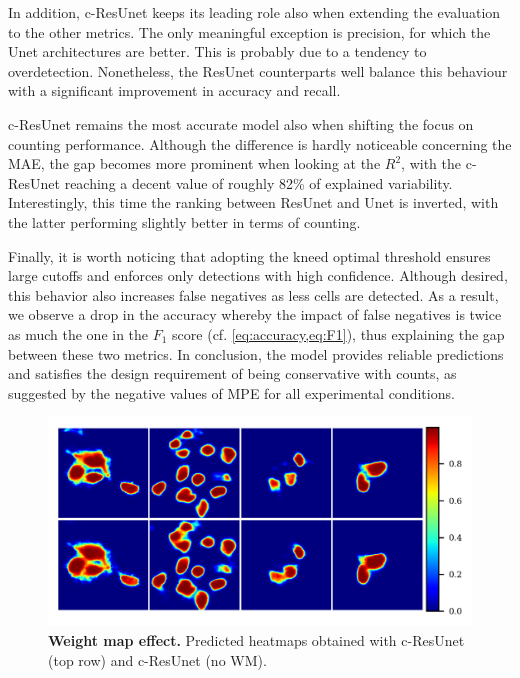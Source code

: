 In addition, c-ResUnet keeps its leading role also when extending the evaluation to the other metrics.
The only meaningful exception is precision, for which the Unet architectures are better. This is probably due to a tendency to overdetection. 
Nonetheless, the ResUnet counterparts well balance this behaviour with a significant improvement in accuracy and recall.

c-ResUnet remains the most accurate model also when shifting the focus on counting performance. Although the difference is hardly noticeable concerning the MAE, the gap becomes more prominent when looking at the $R^2$, with the \mbox{c-ResUnet} reaching a decent value of roughly 82\% of explained variability.
Interestingly, this time the ranking between ResUnet and Unet is inverted, with the latter performing slightly better in terms of counting.

Finally, it is worth noticing that adopting the kneed optimal threshold ensures large cutoffs and enforces only detections with high confidence.
Although desired, this behavior also increases false negatives as less cells are detected. 
As a result, we observe a drop in the accuracy whereby the impact of false negatives is twice as much the one in the $F_1$ score (cf. \cref{eq:accuracy,eq:F1}), thus explaining the gap between these two metrics.
In conclusion, the model provides reliable predictions and satisfies the design requirement of being conservative with counts, as suggested by the negative values of MPE for all experimental conditions.

\begin{figure}[!b]
\centering
\includegraphics[width=\textwidth]{figures/130_methods/weigths_effect.png}
\caption{\textbf{Weight map effect.} 
Predicted heatmaps obtained with c-ResUnet (top row) and c-ResUnet (no WM).} 
\label{fig:weigths_effect}
\end{figure}
